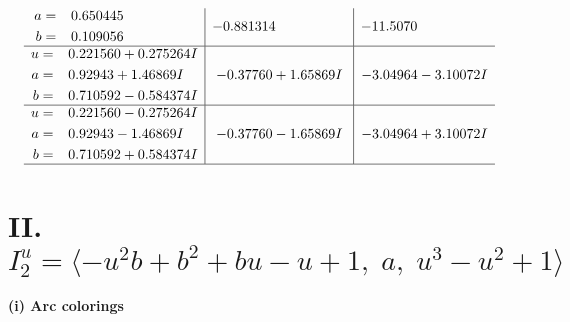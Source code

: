 \documentclass[1p]{elsarticle_modified}
\theoremstyle{definition}
\begin{document}
$$\begin{array}{c|c|c}
\begin{aligned}
a &= \phantom{-}0.650445\phantom{ +0.000000I} \\
b &= \phantom{-}0.109056\phantom{ +0.000000I}\end{aligned}
 & -0.881314\phantom{ +0.000000I} & -11.5070\phantom{ +0.000000I} \\ \hline\begin{aligned}
u &= \phantom{-}0.221560 + 0.275264 I \\
a &= \phantom{-}0.92943 + 1.46869 I \\
b &= \phantom{-}0.710592 - 0.584374 I\end{aligned}
 & -0.37760 + 1.65869 I & -3.04964 - 3.10072 I \\ \hline\begin{aligned}
u &= \phantom{-}0.221560 - 0.275264 I \\
a &= \phantom{-}0.92943 - 1.46869 I \\
b &= \phantom{-}0.710592 + 0.584374 I\end{aligned}
 & -0.37760 - 1.65869 I & -3.04964 + 3.10072 I\\
 \hline 
 \end{array}$$\newpage\newpage\renewcommand{\arraystretch}{1}
\centering \section*{II. $I^u_{2}= \langle - u^2 b+b^2+b u- u+1,\;a,\;u^3- u^2+1 \rangle$}
\flushleft \textbf{(i) Arc colorings}\\
\end{document}
